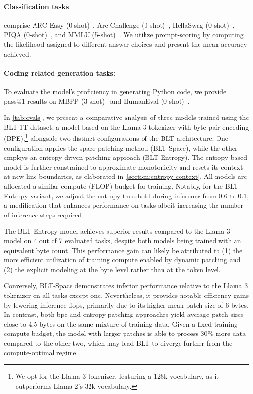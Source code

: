 \paragraph{Classification tasks} comprise ARC-Easy (0-shot)~\citep{Eval_ARC}, Arc-Challenge (0-shot)~\citep{Eval_ARC}, HellaSwag (0-shot)~\citep{Eval_hellaswag}, PIQA (0-shot)~\citep{Eval_piqa}, and MMLU (5-shot)~\citep{hendrycks2020measuring}. We utilize prompt-scoring by computing the likelihood assigned to different answer choices and present the mean accuracy achieved.
\paragraph{Coding related generation tasks:} To evaluate the model's proficiency in generating Python code, we provide pass@1 results on MBPP (3-shot)~\citep{Eval_MBPP} and HumanEval (0-shot)~\citep{Eval_HumanEval}.

In \autoref{tab:evals}, we present a comparative analysis of three models trained using the {\textsc BLT}-1T dataset: a model based on the Llama 3 tokenizer with byte pair encoding (BPE),\footnote{We opt for the Llama 3 tokenizer, featuring a 128k vocabulary, as it outperforms Llama 2’s 32k vocabulary.} alongside two distinct configurations of the {\textsc BLT} architecture. One configuration applies the space-patching method ({\textsc BLT}-Space), while the other employs an entropy-driven patching approach ({\textsc BLT}-Entropy). The entropy-based model is further constrained to approximate monotonicity and resets its context at new line boundaries, as elaborated in~\autoref{section:entropy-context}. All models are allocated a similar compute (FLOP) budget for training. Notably, for the {\textsc BLT}-Entropy variant, we adjust the entropy threshold during inference from 0.6 to 0.1, a modification that enhances performance on tasks albeit increasing the number of inference steps required.

The {\textsc BLT}-Entropy model achieves superior results compared to the Llama 3 model on 4 out of 7 evaluated tasks, despite both models being trained with an equivalent byte count. This performance gain can likely be attributed to (1) the more efficient utilization of training compute enabled by dynamic patching and (2) the explicit modeling at the byte level rather than at the token level.

Conversely, {\textsc BLT}-Space demonstrates inferior performance relative to the Llama 3 tokenizer on all tasks except one. Nevertheless, it provides notable efficiency gains by lowering inference flops, primarily due to its higher mean patch size of 6 bytes. In contrast, both bpe and entropy-patching approaches yield average patch sizes close to 4.5 bytes on the same mixture of training data. Given a fixed training compute budget, the model with larger patches is able to process 30\% more data compared to the other two, which may lead {\textsc BLT} to diverge further from the compute-optimal regime.

